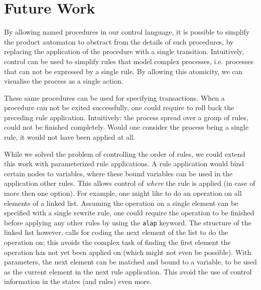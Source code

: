\iffull
\section{Future Work}\label{sec:futurework}
By allowing named procedures in our control language, it is possible to simplify the product automaton to abstract from the details of such procedures, by replacing the application of the procedure with a single transition. Intuitively, control can be used to simplify rules that model complex processes, i.e. processes that can not be expressed by a single rule. By allowing this atomicity, we can visualise the process as a single action.

These same procedures can be used for specifying transactions. When a procedure can not be exited successfully, one could require to roll back the preceding rule application. Intuitively: the process spread over a group of rules, could not be finished completely. Would one consider the process being a single rule, it would not have been applied at all.

While we solved the problem of controlling the order of rules, we could extend this work with parameterized rule applications. A rule application would bind certain nodes to variables, where these bound variables can be used in the application other rules. This allows control of \emph{where} the rule is applied (in case of more then one option).
For example, one might like to do an operation on all elements of a linked list. Assuming the operation on a single element can be specified with a single rewrite rule, one could require the operation to be finished before applying any other rules by using the {\tt alap} keyword. The structure of the linked list however, calls for coding the next element of the list to do the operation on; this avoids the complex task of finding the first element the operation has not yet been applied on (which might not even be possible). With parameters, the next element can be matched and bound to a variable, to be used as the current element in the next rule application. This avoid the use of control information in the states (and rules) even more. 

\fi
